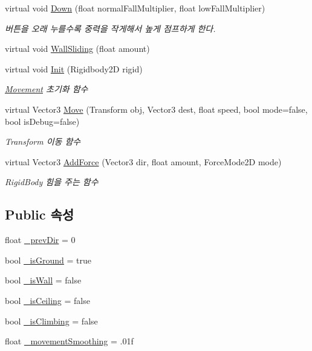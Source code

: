 \begin{DoxyCompactItemize}
virtual void \mbox{\hyperlink{class_player_movement_aa93c724e750d78276b1ef3df18ee2383}{Down}} (float normal\+Fall\+Multiplier, float low\+Fall\+Multiplier)
\begin{DoxyCompactList}\small\item\em 버튼을 오래 누를수록 중력을 작게해서 높게 점프하게 한다. \end{DoxyCompactList}\item 
virtual void \mbox{\hyperlink{class_player_movement_a9a54ca25bbc57c10ddbd74d4a0b1e30f}{Wall\+Sliding}} (float amount)
\item 
virtual void \mbox{\hyperlink{class_movement_a1c50c07edbe274e1cf55253e87506684}{Init}} (Rigidbody2D rigid)
\begin{DoxyCompactList}\small\item\em \mbox{\hyperlink{class_movement}{Movement}} 초기화 함수 \end{DoxyCompactList}\item 
virtual Vector3 \mbox{\hyperlink{class_movement_ad400f155e0556a5e22a74cb77858460a}{Move}} (Transform obj, Vector3 dest, float speed, bool mode=false, bool is\+Debug=false)
\begin{DoxyCompactList}\small\item\em Transform 이동 함수 \end{DoxyCompactList}\item 
virtual Vector3 \mbox{\hyperlink{class_movement_a132e2f7bc0af811ff3b1ab86c8d1f090}{Add\+Force}} (Vector3 dir, float amount, Force\+Mode2D mode)
\begin{DoxyCompactList}\small\item\em Rigid\+Body 힘을 주는 함수 \end{DoxyCompactList}\end{DoxyCompactItemize}
\subsection*{Public 속성}
\begin{DoxyCompactItemize}
\item 
float \mbox{\hyperlink{class_player_movement_a802b794d028125d4e547a9caeb90d3d4}{\+\_\+prev\+Dir}} = 0
\item 
bool \mbox{\hyperlink{class_player_movement_a3096725f76488ebfdc761c53e9fac852}{\+\_\+is\+Ground}} = true
\item 
bool \mbox{\hyperlink{class_player_movement_a675cef6bf2bfaa54c290f2b73caf91cb}{\+\_\+is\+Wall}} = false
\item 
bool \mbox{\hyperlink{class_player_movement_a3701c47b7350464da003c1cc53f1bf69}{\+\_\+is\+Ceiling}} = false
\item 
bool \mbox{\hyperlink{class_player_movement_af8ea9d72a49e01aecdf8cfd6d2b0b3cf}{\+\_\+is\+Climbing}} = false
\item 
float \mbox{\hyperlink{class_movement_aff7ca49ff5d930ac7345da97a5162e3a}{\+\_\+movement\+Smoothing}} = .\+01f
\end{DoxyCompactItemize}
